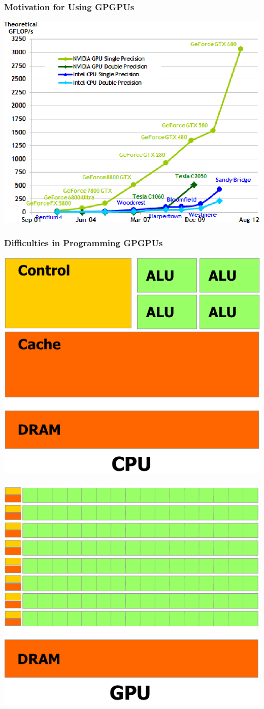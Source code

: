 \documentclass{beamer}
\begin{document}
\begin{frame}[fragile,t]
\frametitle{Motivation for Using GPGPUs}

\begin{center}
\includegraphics[height=43ex]{Figures/Lab1/GFlops.png}
\end  {center}

\end{frame}

\begin{frame}[fragile,t]
\frametitle{Difficulties in Programming GPGPUs}

\begin{center}
\includegraphics[height=24ex]{Figures/Lab1/MulticoreArch.png}$\mbox{ }\mbox{ }\mbox{ }$\includegraphics[height=25ex]{Figures/Lab1/GPGPUarch.png}
\end  {center}


\end{frame}
\end{document}
